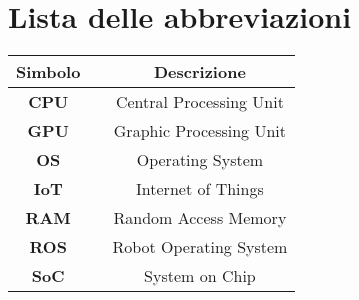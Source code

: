 
\chapter[Lista delle abbreviazioni]{Lista delle abbreviazioni}
\renewcommand{\baselinestretch}{1.5}
\fontsize{14}{14}\selectfont

\begin{center}
\begin{table}[H]
\centering
\setlength{\tabcolsep}{15pt}
\setlength{\extrarowheight}{15pt}
\fontsize{14}{14}\selectfont
\begin{tabular}{ c c c }
\multicolumn{1}{c}{\Large \textbf{Simbolo}} & & \multicolumn{1}{c}{\Large \textbf{Descrizione}}\\
\hline\hline
\textbf{CPU} & & Central Processing Unit\\
\textbf{GPU} & & Graphic Processing Unit\\
\textbf{OS}  & & Operating System\\
\textbf{IoT} & & Internet of Things\\
\textbf{RAM} & & Random Access Memory\\
\textbf{ROS} & & Robot Operating System\\
\textbf{SoC} & & System on Chip\\
\end{tabular}
\end{table}
\end{center}
\newpage
